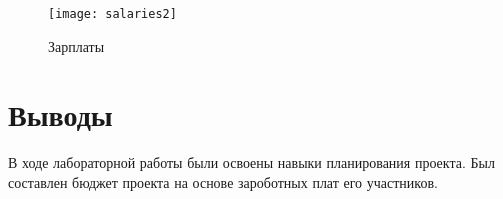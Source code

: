 \documentclass[a4paper,14pt]{extarticle}
\begin{document}
\begin{figure}[H]
    \centering
    \texttt{[image: salaries2]}
    \caption{Зарплаты}
    \label{fig:salaries2}
\end{figure}

\section*{Выводы}
В ходе лабораторной работы были освоены навыки планирования проекта. Был
составлен бюджет проекта на основе зароботных плат его участников.
\end{document}
